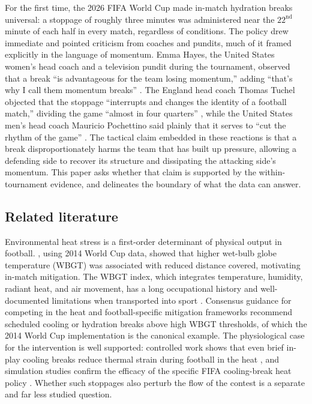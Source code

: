 \documentclass[11pt]{article}
\begin{document}
For the first time, the 2026 FIFA World Cup made in-match hydration breaks universal: a stoppage of roughly
three minutes was administered near the $22^{\text{nd}}$ minute of each half in every match, regardless of
conditions. The policy drew immediate and pointed criticism from coaches and pundits, much of it framed
explicitly in the language of momentum. Emma Hayes, the United States women's head coach and a television
pundit during the tournament, observed that a break ``is advantageous for the team losing momentum,'' adding
``that's why I call them momentum breaks'' \citep{hayes2026momentum}. The England head coach Thomas Tuchel
objected that the stoppage ``interrupts and changes the identity of a football match,'' dividing the game
``almost in four quarters'' \citep{tuchel2026identity}, while the United States men's head coach Mauricio
Pochettino said plainly that it serves to ``cut the rhythm of the game'' \citep{pochettino2026rhythm}. The
tactical claim embedded in these reactions is that a break disproportionately harms the team that has built up
pressure, allowing a defending side to recover its structure and dissipating the attacking side's momentum.
This paper asks whether that claim is supported by the within-tournament evidence, and delineates the boundary
of what the data can answer.

\subsection{Related literature}

Environmental heat stress is a first-order determinant of physical output in football.
\citet{nassis2015heat}, using 2014 World Cup data, showed that higher wet-bulb globe temperature (WBGT) was
associated with reduced distance covered, motivating in-match mitigation. The WBGT index, which integrates
temperature, humidity, radiant heat, and air movement, has a long occupational history and well-documented
limitations when transported into sport \citep{budd2008wbgt}. Consensus guidance for competing in the heat
\citep{racinais2015consensus} and football-specific mitigation frameworks \citep{gouttebarge2023hottips}
recommend scheduled cooling or hydration breaks above high WBGT thresholds, of which the 2014 World Cup
implementation is the canonical example. The physiological case for the intervention is well supported:
controlled work shows that even brief in-play cooling breaks reduce thermal strain during football in the heat
\citep{chalmers2019cooling}, and simulation studies confirm the efficacy of the specific FIFA cooling-break
heat policy \citep{brown2025fifa}. Whether such stoppages also perturb the flow of the contest is a separate
and far less studied question.
\end{document}
